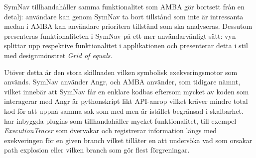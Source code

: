 SymNav tillhandahåller samma funktionalitet som AMBA gör bortsett från en
detalj: användare kan genom SymNav ta bort tillstånd som inte är intressanta medan
i AMBA kan användare prioritera tillstånd som ska analyseras. Dessutom presenteras
funktionaliteten i SymNav på ett mer användarvänligt sätt: vyn splittar upp
respektive funktionalitet i applikationen och presenterar detta i stil med
designmönstret \emph{Grid of equals}.

Utöver detta är den stora skillnaden vilken symbolisk exekveringsmotor som
används. SymNav använder Angr, och AMBA använder, som tidigare nämnt, \stoe{}
vilket innebär att SymNav får en enklare kodbas eftersom mycket av koden som
interagerar med Angr är pythonskript likt API-anrop vilket kräver mindre total
kod för att uppnå samma sak som med \stoe{} men är istället begränsad i
skalbarhet. \stoe{} har inbyggda plugins som tillhandahåller mycket
funktionalitet, till exempel \emph{ExecutionTracer} som övervakar och
registrerar information längs med exekveringen för en given branch vilket
tillåter en att undersöka vad som orsakar path explosion eller vilken branch som
gör flest förgreningar.
